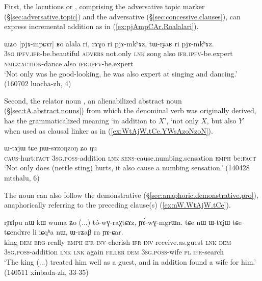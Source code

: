 First, the locutions  or , comprising the adversative topic marker  (§\ref{sec:adversative.topic}) and the adversative  (§\ref{sec:concessive.clauses}), can express incremental addition as in (\ref{ex:pjAmpCAr.Roalalari}).

\begin{exe}
\ex \label{ex:pjAmpCAr.Roalalari}
\gll ɯʑo [pjɤ-mpɕɤr] ʁo alala ri, rɤɣo ri pjɤ-mkʰɤz, tɯ-rɟaʁ ri pjɤ-mkʰɤz. \\
\textsc{3sg} \textsc{ipfv}.\textsc{ifr}-be.beautiful \textsc{advers} not.only \textsc{lnk} song also \textsc{ifr}.\textsc{ipfv}-be.expert \textsc{nmlz}:\textsc{action}-dance also \textsc{ifr}.\textsc{ipfv}-be.expert  \\
\glt `Not only was he good-looking, he was also expert at singing and dancing.' (160702 luocha-zh, 4)
\end{exe}

Second, the relator noun , an alienabilized abstract noun (§\ref{sec:tA.abstract.nouns}) from which the denominal verb  was originally derived, has the grammaticalized meaning `in addition to $X$', `not only $X$, but also $Y$' when used as clausal linker as in (\ref{ex:WtAjW.tCe.YWsAzoNzoN}).

\begin{exe}
\ex \label{ex:WtAjW.tCe.YWsAzoNzoN}
\gll  [ɕɯ-mŋɤm] ɯ-tɤjɯ tɕe ɲɯ-sɤzoŋzoŋ ʑo ŋu \\
\textsc{caus}-hurt:\textsc{fact} \textsc{3sg}.\textsc{poss}-addition \textsc{lnk} \textsc{sens}-cause.numbing.sensation \textsc{emph} be:\textsc{fact} \\
\glt `Not only does (nettle sting) hurts, it also cause a numbing sensation.' (140428 mtshalu, 6)
\end{exe}

The noun  can also follow the demonstrative  (§\ref{sec:anaphoric.demonstrative.pro}), anaphorically referring to the preceding clause(s) (\ref{ex:nW.WtAjW.tCe}).

\begin{exe}
\ex \label{ex:nW.WtAjW.tCe}
\gll  rɟɤlpu nɯ kɯ wuma ʑo (...) tó-wɣ-raχtɕɤz, ɲɤ́-wɣ-mgrɯn. tɕe nɯ ɯ-tɤjɯ tɕe tɕendɤre li iɕqʰa nɯ, ɯ-rʑaβ ra ɲɤ-ɕar. \\
king \textsc{dem} \textsc{erg} really \textsc{emph} {  } \textsc{ifr}-\textsc{inv}-cherish \textsc{ifr}-\textsc{inv}-receive.as.guest \textsc{lnk} \textsc{dem} \textsc{3sg}.\textsc{poss}-addition \textsc{lnk} \textsc{lnk} again \textsc{filler} \textsc{dem} \textsc{3sg}.\textsc{poss}-wife \textsc{pl} \textsc{ifr}-search \\
\glt `The king (...) treated him well as a guest, and in addition found a wife for him.' (140511 xinbada-zh, 33-35)
\end{exe}

